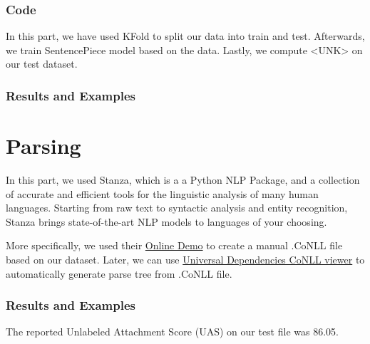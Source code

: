 \documentclass[12pt, a4paper]{article}
\begin{document}
\section*{Code}
In this part, we have used KFold to split our data into train and test. Afterwards, we train SentencePiece model based on the data. Lastly, we compute <UNK> on our test dataset. 

\section*{Results and Examples}


\newpage
\part{Parsing}
In this part, we used Stanza, which is a a Python NLP Package, and a collection of accurate and efficient tools for the linguistic analysis of many human languages. Starting from raw text to syntactic analysis and entity recognition, Stanza brings state-of-the-art NLP models to languages of your choosing.

More specifically, we used their \href{http://stanza.run/}{Online Demo} to create a manual .CoNLL file based on our dataset. Later, we can use \href{https://universaldependencies.org/conllu_viewer.html}{Universal Dependencies CoNLL viewer} to automatically generate parse tree from .CoNLL file.

\section*{Results and Examples}

The reported Unlabeled Attachment Score (UAS) on our test file was 86.05.
\end{document}
